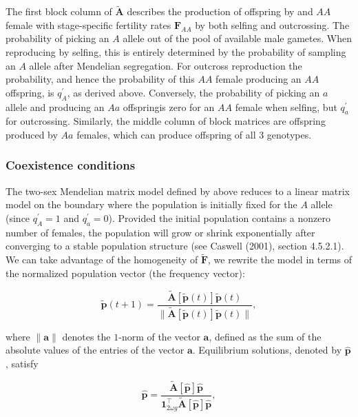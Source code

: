 \documentclass[11pt]{article}
\def\mbf#1{\mathbf{#1}}
\begin{document}
The first block column of $\tilde{\mbf{A}}$ describes the production of offspring by and $AA$ female with stage-specific fertility rates $\mbf{F}_{AA}$ by both selfing and outcrossing. The probability of picking an $A$ allele out of the pool of available male gametes. When reproducing by selfing, this is entirely determined by the probability of sampling an $A$ allele after Mendelian segregation. For outcross reproduction the probability, and hence the probability of this $AA$ female producing an $AA$ offspring, is $q^{\prime}_{A}$, as derived above. Conversely, the probability of picking an $a$ allele and producing an $Aa$ offspringis zero for an $AA$ female when selfing, but $q^{\prime}_a$ for outcrossing. Similarly, the middle column of block matrices are offspring produced by $Aa$ females, which can produce offspring of all $3$ genotypes.

\subsubsection*{Coexistence conditions}

The two-sex Mendelian matrix model defined by above reduces to a linear matrix model on the boundary where the population is initially fixed for the $A$ allele (since $q^{\prime}_{A} = 1$ and $q^{\prime}_{a} = 0$). Provided the initial population contains a nonzero number of females, the population will grow or shrink exponentially after converging to a stable population structure (see Caswell (2001), section 4.5.2.1). We can take advantage of the homogeneity of $\tilde{\mbf{F}}$, we rewrite the model in terms of the normalized population vector (the frequency vector):

\begin{equation} 
	\tilde{\mbf{p}}(t + 1) = \frac{ \tilde{\mbf{A}}[\tilde{\mbf{p}}(t)] \tilde{\mbf{p}}(t) }{ \| \tilde{\mbf{A}}[\tilde{\mbf{p}}(t)] \tilde{\mbf{p}}(t) \|},
\end{equation}

\noindent where $\| \mbf{a} \|$ denotes the $1$-norm of the vector $\mbf{a}$, defined as the sum of the absolute values of the entries of the vector $\mbf{a}$. Equilibrium solutions, denoted by $\hat{\mbf{p}}$, satisfy

\begin{equation} 
	\hat{\mbf{p}} = \frac{ \tilde{\mbf{A}}[\hat{\mbf{p}}] \hat{\mbf{p}} }{ \mbf{1}^{\intercal}_{2 \omega g} \tilde{\mbf{A}}[\hat{\mbf{p}}] \hat{\mbf{p}} },
\end{equation}
\end{document}

